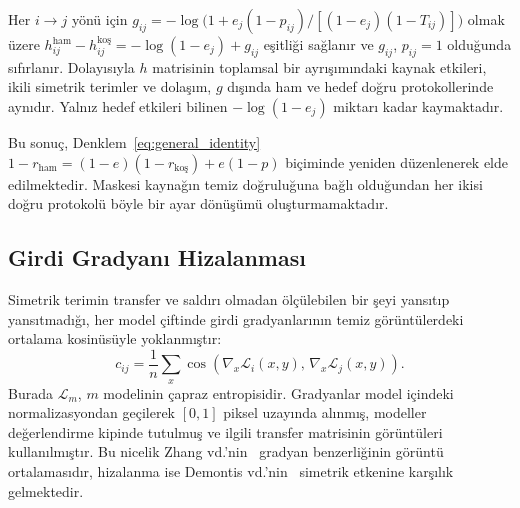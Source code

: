 \begin{proposition}
\label{prop:hscale}
Her $i \to j$ yönü için $g_{ij} = -\log\bigl(1 + e_j(1-p_{ij})/[(1-e_j)(1-T_{ij})]\bigr)$ olmak üzere $h^{\text{ham}}_{ij} - h^{\text{koş}}_{ij} = -\log(1 - e_j) + g_{ij}$ eşitliği sağlanır ve $g_{ij}$, $p_{ij} = 1$ olduğunda sıfırlanır. Dolayısıyla $h$ matrisinin toplamsal bir ayrışımındaki kaynak etkileri, ikili simetrik terimler ve dolaşım, $g$ dışında ham ve hedef doğru protokollerinde aynıdır. Yalnız hedef etkileri bilinen $-\log(1-e_j)$ miktarı kadar kaymaktadır.
\end{proposition}

Bu sonuç, Denklem~\eqref{eq:general_identity} $1 - r_{\text{ham}} = (1-e)(1-r_{\text{koş}}) + e(1-p)$ biçiminde yeniden düzenlenerek elde edilmektedir. Maskesi kaynağın temiz doğruluğuna bağlı olduğundan her ikisi doğru protokolü böyle bir ayar dönüşümü oluşturmamaktadır.

\subsection{Girdi Gradyanı Hizalanması}
\label{subsec:gradcos_def}

Simetrik terimin transfer ve saldırı olmadan ölçülebilen bir şeyi yansıtıp yansıtmadığı, her model çiftinde girdi gradyanlarının temiz görüntülerdeki ortalama kosinüsüyle yoklanmıştır:
\begin{equation}
c_{ij} = \frac{1}{n}\sum_{x} \cos\left(\nabla_x \mathcal{L}_i(x,y),\, \nabla_x \mathcal{L}_j(x,y)\right).
\label{eq:cij}
\end{equation}
Burada $\mathcal{L}_m$, $m$ modelinin çapraz entropisidir. Gradyanlar model içindeki normalizasyondan geçilerek $[0,1]$ piksel uzayında alınmış, modeller değerlendirme kipinde tutulmuş ve ilgili transfer matrisinin görüntüleri kullanılmıştır. Bu nicelik Zhang vd.'nin~\cite{zhang2024why} gradyan benzerliğinin görüntü ortalamasıdır, hizalanma ise Demontis vd.'nin~\cite{demontis2019adversarial} simetrik etkenine karşılık gelmektedir.

